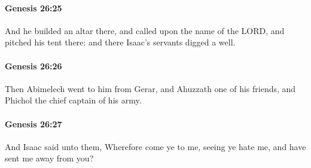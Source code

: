 		\paragraph{Genesis 26:25} %
			\label{GENESIS-26-25}

			And he builded an altar there, and called upon the name of the LORD, and pitched his tent there: and there Isaac's servants digged a well.


		\paragraph{Genesis 26:26} %
			\label{GENESIS-26-26}

			Then Abimelech went to him from Gerar, and Ahuzzath one of his friends, and Phichol the chief captain of his army.


		\paragraph{Genesis 26:27} %
			\label{GENESIS-26-27}

			And Isaac said unto them, Wherefore come ye to me, seeing ye hate me, and have sent me away from you?


